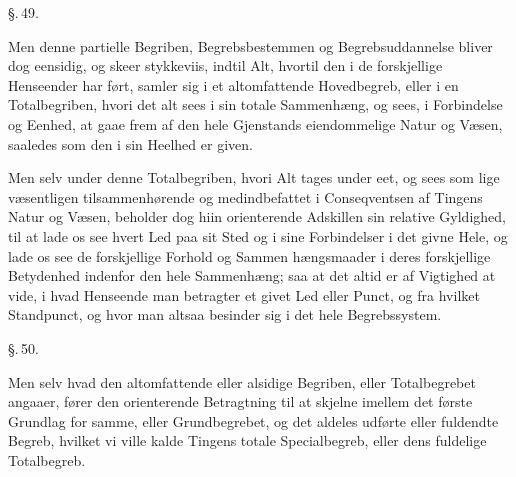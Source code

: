 \documentclass[12pt]{book}
\def\textit#1{#1}%
\def\emph#1{#1}%
\newcommand{\parag}[1]{%
  \par\vspace{0.9\baselineskip}%
  {\centering\textit{\S.\,#1.}\par}%
  \vspace{0.35\baselineskip}%
  \noindent\hspace{\parindent}\ignorespaces
}
\newcommand{\opage}[1]{\marginnote{\footnotesize\textit{[#1]}}}
\begin{document}
\parag{49}

Men denne partielle Begriben, Begrebsbestemmen og Begrebsuddannelse bliver dog
eensidig, og skeer stykkeviis, indtil Alt, hvortil den i de forskjellige
Henseender har ført, samler sig i et \emph{altomfattende Hovedbegreb}, eller i
en \emph{Totalbegriben}, hvori det alt sees i sin totale Sammenhæng, og sees, i
Forbindelse og Eenhed, at gaae frem af den hele Gjenstands eiendommelige Natur
og Væsen, saaledes som den i sin Heelhed er given.

Men selv under denne Totalbegriben, hvori Alt tages under eet, og sees som lige
væsentligen tilsammenhørende og medindbefattet i Conseqventsen af Tingens Natur
og Væsen, beholder dog hiin orienterende Adskillen sin relative Gyldighed, til
at lade os see hvert Led paa sit Sted og i sine Forbindelser i det givne Hele, og
lade os see de forskjellige Forhold og Sammen%
\opage{115}hængsmaader i deres forskjellige Betydenhed indenfor den hele Sammenhæng; saa at
det altid er af Vigtighed at vide, i hvad Henseende man betragter et givet Led
eller Punct, og fra hvilket Standpunct, og hvor man altsaa besinder sig i det
hele Begrebssystem.

\parag{50}

Men selv hvad den altomfattende eller alsidige Begriben, eller Totalbegrebet
angaaer, fører den orienterende Betragtning til at skjelne imellem det første
Grundlag for samme, eller \emph{Grundbegrebet}, og det aldeles udførte eller
fuldendte Begreb, hvilket vi ville kalde Tingens totale \emph{Specialbegreb},
eller dens \emph{fuldelige Totalbegreb}.
\end{document}
